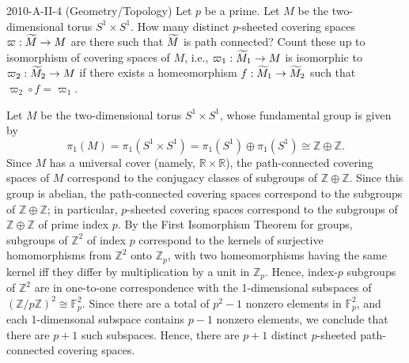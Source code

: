 \documentclass{article}
\begin{document}
\begin{prb}{2010-A-II-4 (Geometry/Topology)}
	Let $p$ be a prime. Let $M$ be the two-dimensional torus $S^{1} \times S^{1}$. How many distinct $p$-sheeted covering spaces $\varpi: \widetilde{M} \to M$ are there such that $\widetilde{M}$ is path connected? Count these up to isomorphism of covering spaces of $M$, i.e., $\varpi_{1}: \widetilde{M}_{1} \to M$ is isomorphic to $\varpi_{2}: \widetilde{M}_{2} \to M$ if there exists a homeomorphism $f: \widetilde{M}_{1} \to \widetilde{M}_{2}$ such that $\varpi_{2} \circ f = \varpi_{1}$. 
\end{prb}
\begin{solutions}
	Let $M$ be the two-dimensional torus $S^{1} \times S^{1}$, whose fundamental group is given by 
		\begin{equation}
			\pi_{1}(M) = \pi_{1}(S^{1} \times S^{1}) = \pi_{1}(S^{1}) \oplus \pi_{1}(S^{1}) \cong \mathbb{Z} \oplus \mathbb{Z}. 
		\end{equation}
	Since $M$ has a universal cover (namely, $\mathbb{R} \times \mathbb{R}$), the path-connected covering spaces of $M$ correspond to the conjugacy classes of subgroups of $\mathbb{Z} \oplus \mathbb{Z}$. Since this group is abelian, the path-connected covering spaces correspond to the subgroups of $\mathbb{Z} \oplus \mathbb{Z}$; in particular, $p$-sheeted covering spaces correspond to the subgroups of $\mathbb{Z} \oplus \mathbb{Z}$ of prime index $p$. By the First Isomorphism Theorem for groups, subgroups of $\mathbb{Z}^{2}$ of index $p$ correspond to the kernels of surjective homomorphisms from $\mathbb{Z}^{2}$ onto $\mathbb{Z}_{p}$, with two homeomorphisms having the same kernel iff they differ by multiplication by a unit in $\mathbb{Z}_{p}$. Hence, index-$p$ subgroups of $\mathbb{Z}^{2}$ are in one-to-one correspondence with the 1-dimensional subspaces of $(\mathbb{Z}/p\mathbb{Z})^{2} \cong \mathbb{F}_{p}^{2}$. Since there are a total of $p^{2} - 1$ nonzero elements in $\mathbb{F}_{p}^{2}$, and each 1-dimensonal subspace contains $p-1$ nonzero elements, we conclude that there are $p + 1$ such subspaces. Hence, there are $p + 1$ distinct $p$-sheeted path-connected covering spaces. 
\end{solutions}
\end{document}

